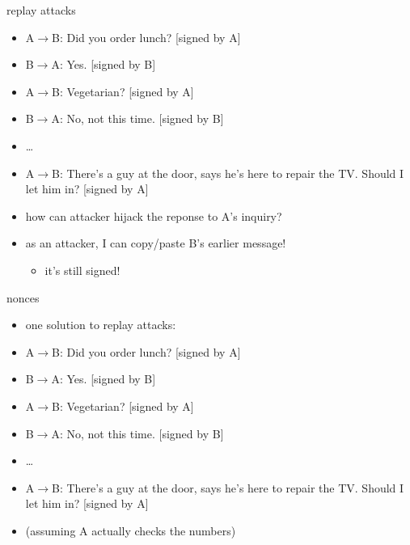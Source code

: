 \begin{frame}{replay attacks}
    \begin{itemize}
    \item A$\rightarrow$B: Did you order lunch? [signed by A]
    \item B$\rightarrow$A: Yes. [signed by B]
    \item A$\rightarrow$B: Vegetarian? [signed by A]
    \item B$\rightarrow$A: No, not this time. [signed by B]
    \item \ldots
    \item A$\rightarrow$B: There's a guy at the door, says he's here to repair the TV. Should I let him in? [signed by A]
    \item how can attacker hijack the reponse to A's inquiry?
    \vspace{.5cm}
    \item<2-> as an attacker, I can copy/paste B's earlier message!
        \begin{itemize}
        \item it's still signed!
        \end{itemize}
    \end{itemize}
\end{frame}

\begin{frame}{nonces}
    \begin{itemize}
    \item one solution to replay attacks:
    \item A$\rightarrow$B:  Did you order lunch? [signed by A]
    \item B$\rightarrow$A:  Yes. [signed by B]
    \item A$\rightarrow$B:  Vegetarian? [signed by A]
    \item B$\rightarrow$A:  No, not this time. [signed by B]
    \item \ldots
    \item A$\rightarrow$B:  There's a guy at the door, says he's here to repair the TV. Should I let him in? [signed by A]
    \vspace{.5cm}
    \item (assuming A actually checks the numbers)
    \end{itemize}
\end{frame}
